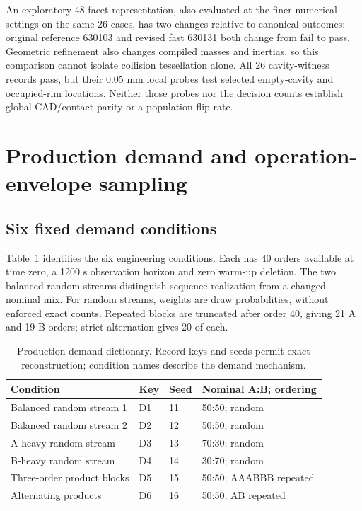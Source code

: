 An exploratory 48-facet representation, also evaluated at the finer numerical settings on the same 26 cases, has two changes relative to canonical outcomes: original reference 630103 and revised fast 630131 both change from fail to pass. Geometric refinement also changes compiled masses and inertias, so this comparison cannot isolate collision tessellation alone. All 26 cavity-witness records pass, but their 0.05 mm local probes test selected empty-cavity and occupied-rim locations. Neither those probes nor the decision counts establish global CAD/contact parity or a population flip rate.

\section{Production demand and operation-envelope sampling}
\subsection{Six fixed demand conditions}
Table~\ref{tab:production-demand-details} identifies the six engineering conditions. Each has 40 orders available at time zero, a 1200 s observation horizon and zero warm-up deletion. The two balanced random streams distinguish sequence realization from a changed nominal mix. For random streams, weights are draw probabilities, without enforced exact counts. Repeated blocks are truncated after order 40, giving 21 A and 19 B orders; strict alternation gives 20 of each.

\begin{table}[htbp]
\centering\small
\caption{Production demand dictionary. Record keys and seeds permit exact reconstruction; condition names describe the demand mechanism.}
\label{tab:production-demand-details}
\begin{tabular}{@{}llll@{}}
\toprule
Condition & Key & Seed & Nominal A:B; ordering\\
\midrule
Balanced random stream 1 & D1 & 11 & 50:50; random\\
Balanced random stream 2 & D2 & 12 & 50:50; random\\
A-heavy random stream & D3 & 13 & 70:30; random\\
B-heavy random stream & D4 & 14 & 30:70; random\\
Three-order product blocks & D5 & 15 & 50:50; AAABBB repeated\\
Alternating products & D6 & 16 & 50:50; AB repeated\\
\bottomrule
\end{tabular}
\end{table}


